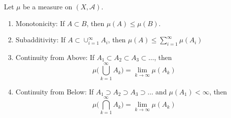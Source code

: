   \begin{theorem}
    Let $\mu$ be a measure on $(X, \mathcal{A})$. 
    \begin{enumerate}
      \item Monotonicity: If $A \subset B$, then $\mu(A) \leq \mu(B)$. 
      \item Subadditivity: If $A \subset \cup_{i=1}^\infty A_i$, then $\mu(A) \leq \sum_{i=1}^\infty \mu (A_i)$ 
      \item Continuity from Above: If $A_1 \subset A_2 \subset A_3 \subset \ldots$, then 
      \begin{equation}
        \mu\bigg( \bigcup_{k=1}^\infty A_k \bigg) = \lim_{k \rightarrow \infty} \mu(A_k)
      \end{equation}
      \item Continuity from Below: If $A_1 \supset A_2 \supset A_3 \supset \ldots$ and $\mu(A_1) < \infty$, then 
      \begin{equation}
        \mu\bigg( \bigcap_{k=1}^\infty A_k \bigg) = \lim_{k \rightarrow \infty} \mu(A_k)
      \end{equation}
    \end{enumerate}
  \end{theorem}

